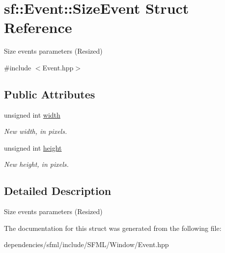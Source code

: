 \hypertarget{structsf_1_1_event_1_1_size_event}{}\section{sf\+:\+:Event\+:\+:Size\+Event Struct Reference}
\label{structsf_1_1_event_1_1_size_event}


Size events parameters (Resized)  




{\ttfamily \#include $<$Event.\+hpp$>$}

\subsection*{Public Attributes}
\begin{DoxyCompactItemize}
\item 
\mbox{\label{structsf_1_1_event_1_1_size_event_a20ea1b78c9bb1604432f8f0067bbfd94}} 
unsigned int \hyperlink{structsf_1_1_event_1_1_size_event_a20ea1b78c9bb1604432f8f0067bbfd94}{width}
\begin{DoxyCompactList}\small\item\em New width, in pixels. \end{DoxyCompactList}\item 
\mbox{\label{structsf_1_1_event_1_1_size_event_af0f76a599d5f48189cb8d78d4e5facdb}} 
unsigned int \hyperlink{structsf_1_1_event_1_1_size_event_af0f76a599d5f48189cb8d78d4e5facdb}{height}
\begin{DoxyCompactList}\small\item\em New height, in pixels. \end{DoxyCompactList}\end{DoxyCompactItemize}


\subsection{Detailed Description}
Size events parameters (Resized) 

The documentation for this struct was generated from the following file\+:\begin{DoxyCompactItemize}
\item 
dependencies/sfml/include/\+S\+F\+M\+L/\+Window/Event.\+hpp\end{DoxyCompactItemize}

